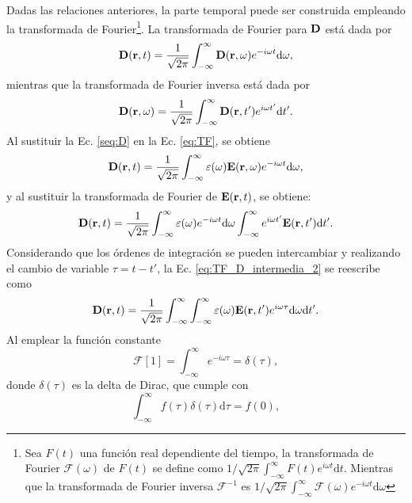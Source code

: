 Dadas las relaciones anteriores, la parte temporal puede ser construida empleando la transformada de Fourier\footnote{Sea $F(t)$ una función real dependiente del tiempo, la transformada de Fourier $\mathcal{F}(\omega)$ de $F(t)$ se define como $1/\sqrt{2\pi}\int_{-\infty}^{\infty}F(t)e^{i\omega t} \text{d}t$. Mientras que la transformada de Fourier inversa $\mathcal{F}^{-1}$ es $1/\sqrt{2\pi}\int_{-\infty}^{\infty}\mathcal{F}(\omega)e^{-i\omega t} \text{d}\omega$ }. La transformada de Fourier para $\vb{D}$ está dada por
%
\begin{equation}
	\vb{D}(\vb{r},t)=\frac{1}{\sqrt{2\pi}}\int_{-\infty}^{\infty}\vb{D}(\vb{r},\omega)e^{-i\omega t}\text{d}\omega,\label{eq:TF}
\end{equation}
%
mientras que la transformada de Fourier inversa está dada por
%
\begin{equation}
	\vb{D}(\vb{r},\omega)=\frac{1}{\sqrt{2\pi}}\int_{-\infty}^{\infty}\vb{D}(\vb{r},t')e^{i\omega t'}\text{d}t'.\label{eq:TFI}
\end{equation}
%
Al sustituir la Ec. \eqref{seq:D} en la Ec. \eqref{eq:TF}, se obtiene
%
\begin{equation}
	\vb{D}(\vb{r},t)=\frac{1}{\sqrt{2\pi}}\int_{-\infty}^{\infty}\varepsilon(\omega)\vb{E}(\vb{r},\omega)e^{-i\omega t}\text{d}\omega,\label{eq:TF_D_intermedia_1}
\end{equation}
%
y al sustituir la transformada de Fourier de $\vb{E}(\vb{r},t)$, se obtiene:
%
\begin{equation}
	\vb{D}(\vb{r},t)=\frac{1}{\sqrt{2\pi}}\int_{-\infty}^{\infty}\varepsilon(\omega)e^{-i\omega t}\text{d}\omega\int_{-\infty}^{\infty}e^{i\omega t'}\vb{E}(\vb{r},t')\text{d}t'.\label{eq:TF_D_intermedia_2}
\end{equation}
%
Considerando que los órdenes de integración se pueden intercambiar y realizando el cambio de variable $\tau=t-t'$, la Ec. \eqref{eq:TF_D_intermedia_2} se reescribe como
%
\begin{equation}
	\vb{D}(\vb{r},t)=\frac{1}{\sqrt{2\pi}}\int_{-\infty}^{\infty}\int_{-\infty}^{\infty}\varepsilon(\omega)\vb{E}(\vb{r},t') e^{i\omega \tau} \text{d}\omega \text{d}t'.\label{eq:TF_D_intermedia_2}
\end{equation}
%
Al emplear la función constante
\begin{equation}
	\mathcal{F}[1]=\int_{-\infty}^{\infty}e^{-i\omega\tau}=\delta(\tau),
\end{equation}
donde $\delta(\tau)$ es la delta de Dirac, que cumple con
\begin{equation}
	\int_{-\infty}^{\infty}f(\tau)\delta(\tau)\text{d}\tau=f(0),
\end{equation}

